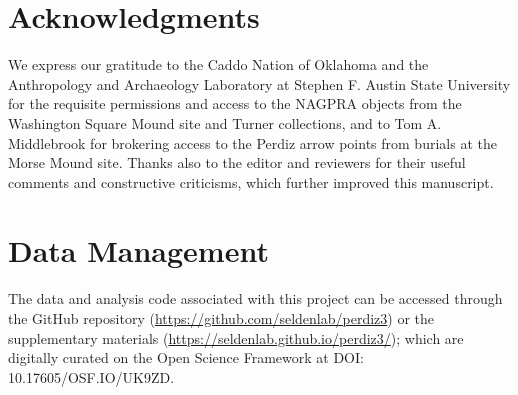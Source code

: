 \documentclass[smallextended]{svjour3}       %
\begin{document}
\hypertarget{acknowledgments}{%
\section*{Acknowledgments}\label{acknowledgments}}

We express our gratitude to the Caddo Nation of Oklahoma and the
Anthropology and Archaeology Laboratory at Stephen F. Austin State
University for the requisite permissions and access to the NAGPRA
objects from the Washington Square Mound site and Turner collections,
and to Tom A. Middlebrook for brokering access to the Perdiz arrow
points from burials at the Morse Mound site. Thanks also to the editor
and reviewers for their useful comments and constructive criticisms,
which further improved this manuscript.

\hypertarget{data-management}{%
\section*{Data Management}\label{data-management}}

The data and analysis code associated with this project can be accessed
through the GitHub repository
(\url{https://github.com/seldenlab/perdiz3}) or the supplementary
materials (\url{https://seldenlab.github.io/perdiz3/}); which are
digitally curated on the Open Science Framework at \newline DOI:
10.17605/OSF.IO/UK9ZD.




\end{document}
